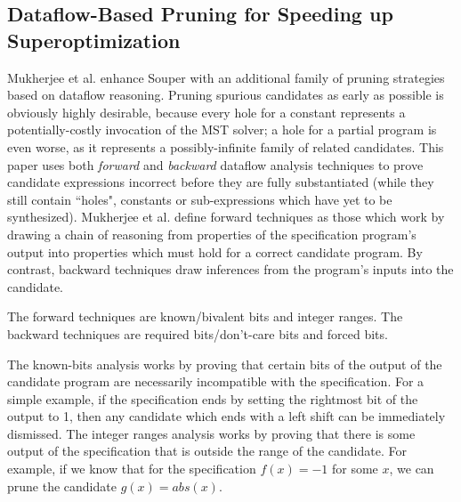 \documentclass[12pt,twoside]{reedthesis}
\begin{document}
        \subsection{Dataflow-Based Pruning for Speeding up Superoptimization}
            Mukherjee et al. \cite{mukherjee2020dataflow} enhance Souper with an additional family of pruning strategies based on dataflow reasoning. 
            Pruning spurious candidates as early as possible is obviously highly desirable, because every hole for a constant represents a potentially-costly invocation of the MST solver; a hole for a partial program is even worse, as it represents a possibly-infinite family of related candidates.
            This paper uses both \textit{forward} and \textit{backward} dataflow analysis techniques to prove candidate expressions incorrect before they are fully substantiated (while they still contain ``holes", constants or sub-expressions which have yet to be synthesized).
            Mukherjee et al. define forward techniques as those which work by drawing a chain of reasoning from properties of the specification program's output into properties which must hold for a correct candidate program.
            By contrast, backward techniques draw inferences from the program's inputs into the candidate.
            
            The forward techniques are known/bivalent bits and integer ranges.
            The backward techniques are required bits/don't-care bits and forced bits.
            
            The known-bits analysis works by proving that certain bits of the output of the candidate program are necessarily incompatible with the specification.
                For a simple example, if the specification ends by setting the rightmost bit of the output to 1, then any candidate which ends with a left shift can be immediately dismissed.
            The integer ranges analysis works by proving that there is some output of the specification that is outside the range of the candidate.
                For example, if we know that for the specification $f(x) = -1$ for some $x$, we can prune the candidate $g(x) = abs(x)$.
            
\end{document}
